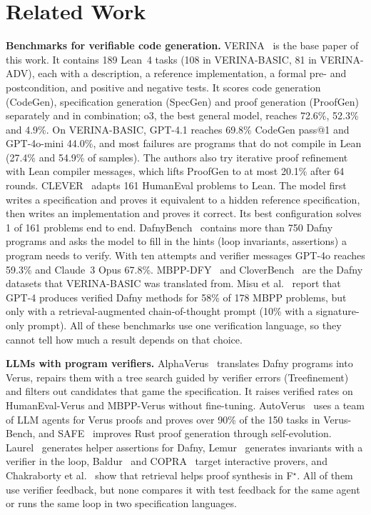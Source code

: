 \section{Related Work}
\label{sec:related}

\textbf{Benchmarks for verifiable code generation.}
VERINA~\cite{ye2026verina} is the base paper of this work. It contains 189 Lean~4 tasks (108 in VERINA-BASIC, 81 in VERINA-ADV), each with a description, a reference implementation, a formal pre- and postcondition, and positive and negative tests. It scores code generation (CodeGen), specification generation (SpecGen) and proof generation (ProofGen) separately and in combination; o3, the best general model, reaches 72.6\%, 52.3\% and 4.9\%. On VERINA-BASIC, GPT-4.1 reaches 69.8\% CodeGen pass@1 and GPT-4o-mini 44.0\%, and most failures are programs that do not compile in Lean (27.4\% and 54.9\% of samples). The authors also try iterative proof refinement with Lean compiler messages, which lifts ProofGen to at most 20.1\% after 64 rounds. CLEVER~\cite{thakur2025clever} adapts 161 HumanEval problems to Lean. The model first writes a specification and proves it equivalent to a hidden reference specification, then writes an implementation and proves it correct. Its best configuration solves 1 of 161 problems end to end. DafnyBench~\cite{loughridge2025dafnybench} contains more than 750 Dafny programs and asks the model to fill in the hints (loop invariants, assertions) a program needs to verify. With ten attempts and verifier messages GPT-4o reaches 59.3\% and Claude~3 Opus 67.8\%. MBPP-DFY~\cite{misu2024dafnysynthesis} and CloverBench~\cite{sun2024clover} are the Dafny datasets that VERINA-BASIC was translated from. Misu et al.~\cite{misu2024dafnysynthesis} report that GPT-4 produces verified Dafny methods for 58\% of 178 MBPP problems, but only with a retrieval-augmented chain-of-thought prompt (10\% with a signature-only prompt). All of these benchmarks use one verification language, so they cannot tell how much a result depends on that choice.

\textbf{LLMs with program verifiers.}
AlphaVerus~\cite{aggarwal2025alphaverus} translates Dafny programs into Verus, repairs them with a tree search guided by verifier errors (Treefinement) and filters out candidates that game the specification. It raises verified rates on HumanEval-Verus and MBPP-Verus without fine-tuning. AutoVerus~\cite{yang2025autoverus} uses a team of LLM agents for Verus proofs and proves over 90\% of the 150 tasks in Verus-Bench, and SAFE~\cite{chen2025safe} improves Rust proof generation through self-evolution. Laurel~\cite{mugnier2025laurel} generates helper assertions for Dafny, Lemur~\cite{wu2024lemur} generates invariants with a verifier in the loop, Baldur~\cite{first2023baldur} and COPRA~\cite{thakur2024copra} target interactive provers, and Chakraborty et al.~\cite{chakraborty2025fstar} show that retrieval helps proof synthesis in F$^\star$. All of them use verifier feedback, but none compares it with test feedback for the same agent or runs the same loop in two specification languages.

